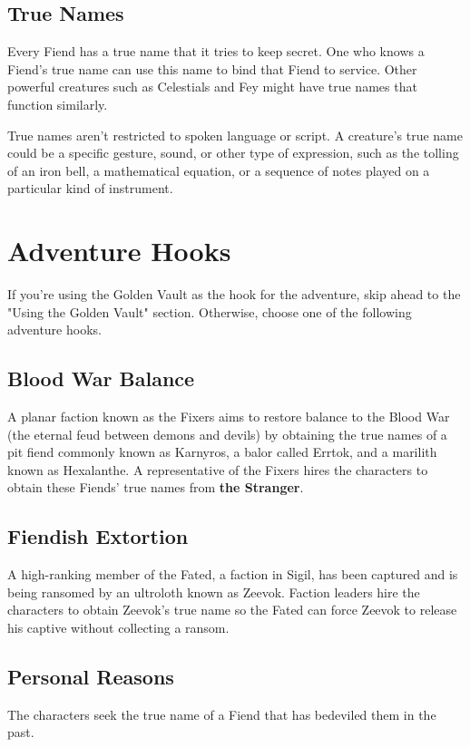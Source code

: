 \documentclass[10pt,a4paper,twoside,bg=print,twocolumn,openany,nodeprecatedcode]{dndarticle}
\begin{document}
\subsection{True Names}
Every Fiend has a true name that it tries to keep secret. One who knows a Fiend's true name can use this name to bind that Fiend to service. Other powerful creatures such as Celestials and Fey might have true names that function similarly.

True names aren't restricted to spoken language or script. A creature's true name could be a specific gesture, sound, or other type of expression, such as the tolling of an iron bell, a mathematical equation, or a sequence of notes played on a particular kind of instrument.

\section{Adventure Hooks}
If you're using the Golden Vault as the hook for the adventure, skip ahead to the "Using the Golden Vault" section. Otherwise, choose one of the following adventure hooks.

\subsection{Blood War Balance}
A planar faction known as the Fixers aims to restore balance to the Blood War (the eternal feud between demons and devils) by obtaining the true names of a pit fiend commonly known as Karnyros, a balor called Errtok, and a marilith known as Hexalanthe. A representative of the Fixers hires the characters to obtain these Fiends' true names from \textbf{the Stranger}.

\subsection{Fiendish Extortion}
A high-ranking member of the Fated, a faction in Sigil, has been captured and is being ransomed by an ultroloth known as Zeevok. Faction leaders hire the characters to obtain Zeevok's true name so the Fated can force Zeevok to release his captive without collecting a ransom.

\subsection{Personal Reasons}
The characters seek the true name of a Fiend that has bedeviled them in the past.
\end{document}
